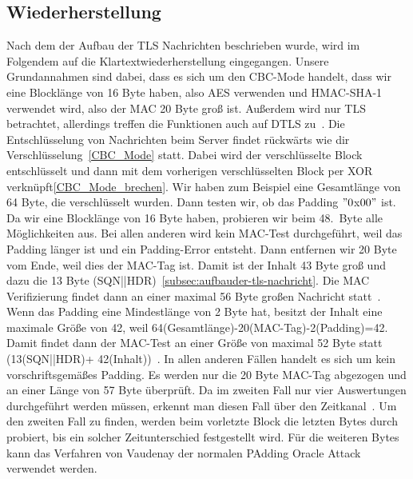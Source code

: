 \documentclass[a4paper,10pt]{scrartcl}
\begin{document}
    \subsection{Wiederherstellung}\label{subsec:wiederherstellung}
    Nach dem der Aufbau der TLS Nachrichten beschrieben wurde, wird im Folgendem auf die Klartextwiederherstellung eingegangen.
    Unsere Grundannahmen sind dabei, dass es sich um den CBC-Mode handelt, dass wir eine Blocklänge von 16 Byte haben, also AES verwenden und HMAC-SHA-1 verwendet wird, also der MAC 20 Byte groß ist.
    Außerdem wird nur TLS betrachtet, allerdings treffen die Funktionen auch auf DTLS zu~\cite[s.7]{AlFardan2013}.
    \newline
    Die Entschlüsselung von Nachrichten beim Server findet rückwärts wie dir Verschlüsselung~\ref{CBC_Mode} statt.
    Dabei wird der verschlüsselte Block entschlüsselt und dann mit dem vorherigen verschlüsselten Block per XOR verknüpft\ref{CBC_Mode_brechen}.
    \newline
    Wir haben zum Beispiel eine Gesamtlänge von 64 Byte, die verschlüsselt wurden.
    Dann testen wir, ob das Padding \("0\)x\(00"\) ist.
    Da wir eine Blocklänge von 16 Byte haben, probieren wir beim 48.\ Byte alle Möglichkeiten aus.
    Bei allen anderen wird kein MAC-Test durchgeführt, weil das Padding länger ist und ein Padding-Error entsteht.
    Dann entfernen wir 20 Byte vom Ende, weil dies der MAC-Tag ist.
    Damit ist der Inhalt 43 Byte groß und dazu die 13 Byte (SQN||HDR)~\ref{subsec:aufbauder-tls-nachricht}.
    Die MAC Verifizierung findet dann an einer maximal 56 Byte großen Nachricht statt~\cite[S.7]{AlFardan2013}.
    \newline
    Wenn das Padding eine Mindestlänge von 2 Byte hat, besitzt der Inhalt eine maximale Größe von 42, weil 64(Gesamtlänge)-20(MAC-Tag)-2(Padding)=42.
    Damit findet dann der MAC-Test an einer Größe von maximal 52 Byte statt (13(SQN||HDR)+ 42(Inhalt))~\cite[S.7]{AlFardan2013}.
    \newline
    In allen anderen Fällen handelt es sich um kein vorschriftsgemäßes Padding.
    Es werden nur die 20 Byte MAC-Tag abgezogen und an einer Länge von 57 Byte überprüft\cite[s.7]{AlFardan2013}.
    Da im zweiten Fall nur vier Auswertungen durchgeführt werden müssen, erkennt man diesen Fall über den Zeitkanal~\cite[s.7]{AlFardan2013}.
    Um den zweiten Fall zu finden, werden beim vorletzte Block die letzten Bytes durch probiert, bis ein solcher Zeitunterschied festgestellt wird.
    Für die weiteren Bytes kann das Verfahren von Vaudenay der normalen PAdding Oracle Attack verwendet werden\cite[S.3]{Vaudenay2002}.
\end{document}
